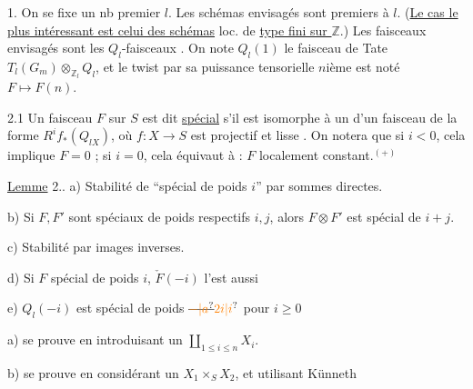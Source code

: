 
1. On se fixe un nb premier $l$. Les schémas envisagés sont premiers à $l$. (\uline{Le cas le plus intéressant est celui des schémas} loc. de \uline{type fini sur $\mathbb Z$}.) Les faisceaux envisagés sont les $Q_l$-faisceaux . On note $Q_l(1)$ le faisceau de Tate $T_l(G_m)\otimes_{\mathbb Z_l}Q_l$, et le twist par sa puissance tensorielle $n$ième est noté $F\longmapsto F(n)$.


2.1 Un faisceau $F$ sur $S$ est dit \uline{spécial}  s'il est isomorphe à un   d'un  faisceau  de la forme $R^i f_*(Q_{lX})$, où $f:X\to S$ est projectif et lisse . \unsure{(|[}On notera que si $i<0$, cela implique $F=0$ ; si $i=0$, cela  équivaut à : $F$ localement constant.$^{(+)}$


\uline{Lemme} 2.. \quad a) Stabilité de \textquotedblleft spécial de poids $i$\textquotedblright{} par  sommes directes.

b) Si $F,F'$ sont spéciaux de poids respectifs $i,j$, alors $F\otimes F'$ est spécial de $i+j$.

c) Stabilité par images inverses.

d) Si $F$ spécial de poids $i$, $\check F(-i)$ l'est aussi

e) $Q_l(-i)$ est spécial de poids $\deleted{\unsure{-|a}}\unsure{2i|i}$ pour $i\ge0$

a) se prouve en introduisant un $\coprod_{1\le i\le n}X_i$.

b) se prouve en considérant un $X_1\times_S X_2$, et utilisant Künneth

